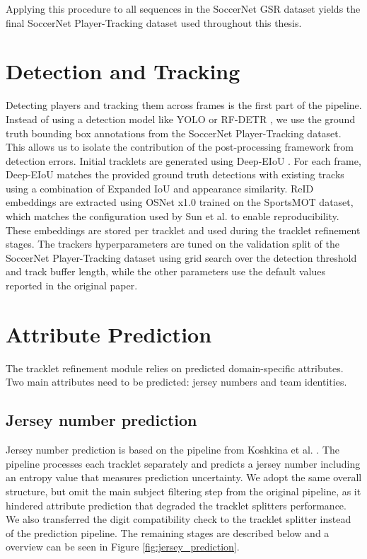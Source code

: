 Applying this procedure to all sequences in the SoccerNet GSR dataset yields the final SoccerNet Player-Tracking dataset used throughout this thesis.

\section{Detection and Tracking}\label{detection_and_tracking}
Detecting players and tracking them across frames is the first part of the pipeline. Instead of using a detection model like YOLO \cite{yolo} or RF-DETR \cite{rfdetr}, we use the ground truth bounding box annotations from the SoccerNet Player-Tracking dataset. This allows us to isolate the contribution of the post-processing framework from detection errors. Initial tracklets are generated using Deep-EIoU \cite{deep-eiou}. For each frame, Deep-EIoU matches the provided ground truth detections with existing tracks using a combination of Expanded IoU and appearance similarity. ReID embeddings are extracted using OSNet x1.0 \cite{osnet} trained on the SportsMOT dataset, which matches the configuration used by Sun et al. \cite{gta} to enable reproducibility. These embeddings are stored per tracklet and used during the tracklet refinement stages. The trackers hyperparameters are tuned on the validation split of the SoccerNet Player-Tracking dataset using grid search over the detection threshold and track buffer length, while the other parameters use the default values reported in the original paper.



\section{Attribute Prediction}\label{attribute_prediction}
The tracklet refinement module relies on predicted domain-specific attributes. Two main attributes need to be predicted: jersey numbers and team identities. 



\subsection{Jersey number prediction}
Jersey number prediction is based on the pipeline from Koshkina et al. \cite{jersey-prediction}. The pipeline processes each tracklet separately and predicts a jersey number including an entropy value that measures prediction uncertainty. We adopt  the same overall structure, but omit the main subject filtering step from the original pipeline,  as it hindered attribute prediction that degraded the tracklet splitters performance. We also transferred the digit compatibility check to the tracklet splitter instead of the prediction pipeline. The remaining stages are described below and a overview can be seen in Figure \ref{fig:jersey_prediction}.

